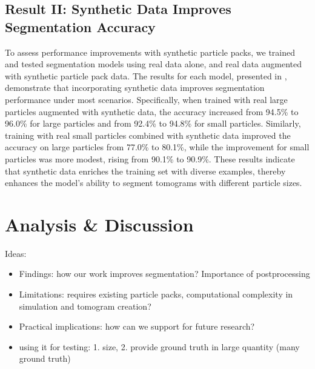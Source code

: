 \documentclass[preprint,12pt]{elsarticle}
\begin{document}
\subsection{Result II: Synthetic Data Improves Segmentation Accuracy}
To assess performance improvements with synthetic particle packs, we trained and tested segmentation models using real data alone, and real data augmented with synthetic particle pack data. 
The results for each model, presented in , demonstrate that incorporating synthetic data improves segmentation performance under most scenarios.
Specifically, when trained with real large particles augmented with synthetic data, the accuracy increased from 94.5\% to 96.0\% for large particles and from 92.4\% to 94.8\% for small particles. 
Similarly, training with real small particles combined with synthetic data improved the accuracy on large particles from 77.0\% to 80.1\%, while the improvement for small particles was more modest, rising from 90.1\% to 90.9\%. 
These results indicate that synthetic data enriches the training set with diverse examples, thereby enhances the model's ability to segment tomograms with different particle sizes. 

\section{Analysis \& Discussion}
Ideas: 
\begin{itemize}
    \item Findings: how our work improves segmentation? Importance of postprocessing
    \item Limitations: requires existing particle packs, computational complexity in simulation and tomogram creation?
    \item Practical implications: how can we support for future research?
    \item using it for testing: 1. size, 2. provide ground truth in large quantity (many ground truth)
\end{itemize}
\end{document}
